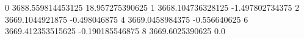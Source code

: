 0 3688.559814453125 18.957275390625
1 3668.104736328125 -1.497802734375
2 3669.1044921875 -0.498046875
4 3669.0458984375 -0.556640625
6 3669.412353515625 -0.190185546875
8 3669.6025390625 0.0
